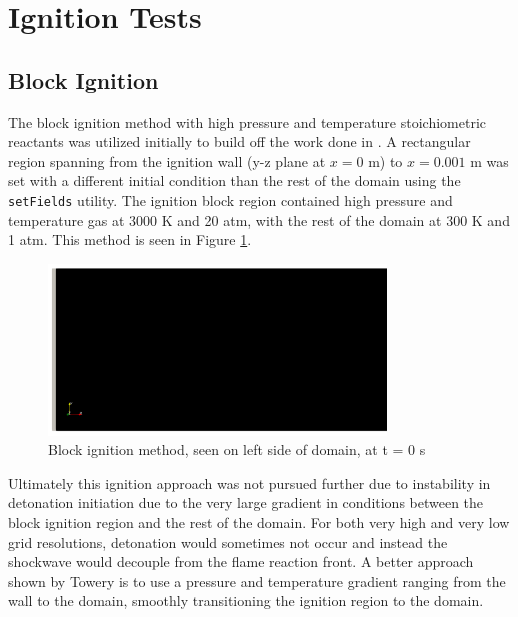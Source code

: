 \section{Ignition Tests}
\label{sec:igstudy}

\subsection{Block Ignition}

The block ignition method with high pressure and temperature stoichiometric reactants was utilized initially to build off the work done in \cite{towery1}. A rectangular region spanning from the ignition wall (y-z plane at \(x = 0\) m) to \(x = 0.001\) m was set with a different initial condition than the rest of the domain using the \verb|setFields| utility. The ignition block region contained high pressure and temperature gas at 3000 K and 20 atm, with the rest of the domain at 300 K and 1 atm. This method is seen in Figure \ref{fig:blockig}.
\begin{figure}[h]
\centering
\includegraphics[width=0.8\textwidth]{figs/ignition/block.png}
\caption{Block ignition method, seen on left side of domain, at t = 0 s}
\label{fig:blockig}
\end{figure}%
\noindent Ultimately this ignition approach was not pursued further due to instability in detonation initiation due to the very large gradient in conditions between the block ignition region and the rest of the domain. For both very high and very low grid resolutions, detonation would sometimes not occur and instead the shockwave would decouple from the flame reaction front. A better approach shown by Towery\cite{towery2} is to use a pressure and temperature gradient ranging from the wall to the domain, smoothly transitioning the ignition region to the domain. 

